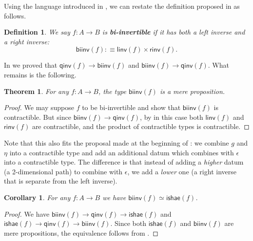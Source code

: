 \documentclass[12pt]{article}
\newcommand{\biinv}{\ensuremath{\mathsf{biinv}}}
\newcommand{\defeq}{\vcentcolon\equiv}
\newcommand{\define}[1]{\textbf{#1}}
\newcommand{\eqv}[2]{\ensuremath{#1 \simeq #2}\xspace}
\newcommand{\ishae}{\ensuremath{\mathsf{ishae}}}
\newcommand{\linv}{\ensuremath{\mathsf{linv}}}
\newcommand{\qinv}{\ensuremath{\mathsf{qinv}}}
\newcommand{\rinv}{\ensuremath{\mathsf{rinv}}}
\newcommand{\vcentcolon}{:\!\!}
\newcounter{mathcount}
\newtheorem{precor}{Corollary}
\newenvironment{cor}{\begin{precor}}{\end{precor}\addtocounter{mathcount}{1}}
\newtheorem{predefn}{Definition}
\newenvironment{defn}{\begin{predefn}}{\end{predefn}\addtocounter{mathcount}{1}}
\newtheorem{prethm}{Theorem}
\newenvironment{thm}{\begin{prethm}}{\end{prethm}\addtocounter{mathcount}{1}}
\begin{document}
%
%
%

Using the language introduced in , we can restate the definition proposed in  as follows.

\begin{defn}\label{defn:biinv}
  We say $f:A\to B$ is \define{bi-invertible}
  if it has both a left inverse and a right inverse:
  \[ \biinv (f) \defeq \linv(f) \times \rinv(f). \]
\end{defn}

In  we proved that $\qinv(f)\to\biinv(f)$ and $\biinv(f)\to\qinv(f)$.
What remains is the following.

\begin{thm}\label{thm:isprop-biinv}
  For any $f:A\to B$, the type $\biinv(f)$ is a mere proposition.
\end{thm}
\begin{proof}
  We may suppose $f$ to be bi-invertible and show that $\biinv(f)$ is contractible.
  But since $\biinv(f)\to\qinv(f)$, by  in this case both $\linv(f)$ and $\rinv(f)$ are contractible, and the product of contractible types is contractible.
\end{proof}

Note that this also fits the proposal made at the beginning of : we combine $g$ and $\eta$ into a contractible type and add an additional datum which combines with $\epsilon$ into a contractible type.
The difference is that instead of adding a \emph{higher} datum (a 2-dimensional path) to combine with $\epsilon$, we add a \emph{lower} one (a right inverse that is separate from the left inverse).

\begin{cor}\label{thm:equiv-biinv-isequiv}
  For any $f:A\to B$ we have $\eqv{\biinv(f)}{\ishae(f)}$.
\end{cor}
\begin{proof}
  We have $\biinv(f) \to \qinv(f) \to \ishae(f)$ and $\ishae(f) \to \qinv(f) \to \biinv(f)$.
  Since both $\ishae(f)$ and $\biinv(f)$ are mere propositions, the equivalence follows from .
\end{proof}

%
%
%
\end{document}
